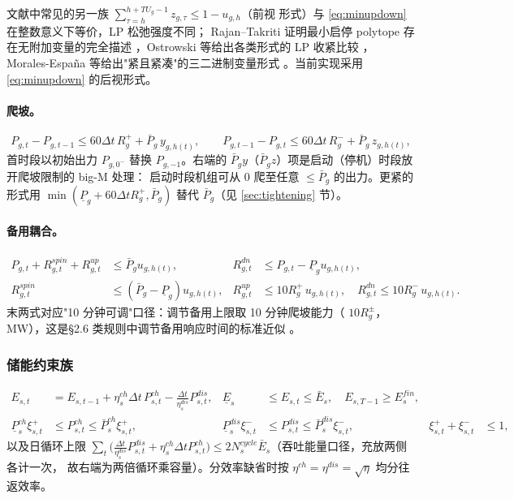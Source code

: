 \begin{remark}[等价紧形式]
文献中常见的另一族 $\sum_{\tau=h}^{h+TU_g-1} z_{g,\tau}\le 1-u_{g,h}$（前视
形式）与 \eqref{eq:minupdown} 在整数意义下等价，LP 松弛强度不同；
Rajan--Takriti 证明最小启停 polytope 存在无附加变量的完全描述
\cite{rajan2005}，Ostrowski 等给出各类形式的 LP 收紧比较
\cite{ostrowski2012}，Morales-España 等给出"紧且紧凑"的三二进制变量形式
\cite{morales2013}。当前实现采用 \eqref{eq:minupdown} 的后视形式。
\end{remark}

\paragraph{爬坡。}
\begin{equation}
P_{g,t}-P_{g,t-1}\le 60\Delta t\,R^+_g + \bar P_g\, y_{g,h(t)},\qquad
P_{g,t-1}-P_{g,t}\le 60\Delta t\,R^-_g + \bar P_g\, z_{g,h(t)},
\label{eq:ramp}
\end{equation}
首时段以初始出力 $P_{g,0^-}$ 替换 $P_{g,-1}$。右端的
$\bar P_g y$（$\bar P_g z$）项是启动（停机）时段放开爬坡限制的 big-M 处理：
启动时段机组可从 0 爬至任意 $\le\bar P_g$ 的出力。更紧的形式用
$\min(\underline P_g+60\Delta t R^+_g,\bar P_g)$ 替代 $\bar P_g$（见
\ref{sec:tightening} 节）。

\paragraph{备用耦合。}
\begin{align}
P_{g,t}+R^{spin}_{g,t}+R^{up}_{g,t}&\le \bar P_g u_{g,h(t)},&
R^{dn}_{g,t}&\le P_{g,t}-\underline P_g u_{g,h(t)},\nonumber\\
R^{spin}_{g,t}&\le (\bar P_g-\underline P_g)u_{g,h(t)},&
R^{up}_{g,t}&\le 10 R^+_g\, u_{g,h(t)},\quad
R^{dn}_{g,t}\le 10 R^-_g\, u_{g,h(t)}.
\label{eq:reserve-coupling}
\end{align}
末两式对应"10 分钟可调"口径：调节备用上限取 10 分钟爬坡能力（
$10 R^{\pm}_g$，MW），这是§2.6 类规则中调节备用响应时间的标准近似
\cite{southern2025}。

\subsubsection{储能约束族}

\begin{align}
E_{s,t}&=E_{s,t-1}+\eta^{ch}_s \Delta t\, P^{ch}_{s,t}
-\frac{\Delta t}{\eta^{dis}_s} P^{dis}_{s,t},&
\underline E_s&\le E_{s,t}\le \bar E_s,\quad E_{s,T-1}\ge E^{fin}_s,
\label{eq:soc}\\
\underline P^{ch}_s \xi^+_{s,t}&\le P^{ch}_{s,t}\le \bar P^{ch}_s \xi^+_{s,t},&
\underline P^{dis}_s \xi^-_{s,t}&\le P^{dis}_{s,t}\le \bar P^{dis}_s \xi^-_{s,t},&
\xi^+_{s,t}+\xi^-_{s,t}&\le 1,
\label{eq:sto-bin}
\end{align}
以及日循环上限
$\sum_t\big(\tfrac{\Delta t}{\eta^{dis}_s}P^{dis}_{s,t}+\eta^{ch}_s\Delta t
P^{ch}_{s,t}\big)\le 2 N^{cycle}_s \bar E_s$（吞吐能量口径，充放两侧各计一次，
故右端为两倍循环乘容量）。分效率缺省时按 $\eta^{ch}=\eta^{dis}=\sqrt\eta$
均分往返效率。

